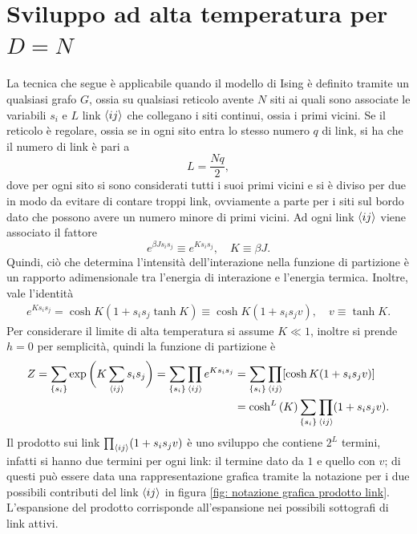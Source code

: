 \section{Sviluppo ad alta temperatura per \texorpdfstring{$D = N$}{D = N}}
La tecnica che segue è applicabile quando il modello di Ising è definito tramite un qualsiasi grafo $G$, ossia su qualsiasi reticolo avente $N$ siti ai quali sono associate le variabili $s_i$ e $L$ link $\langle ij \rangle$ che collegano i siti continui, ossia i primi vicini. Se il reticolo è regolare, ossia se in ogni sito entra lo stesso numero $q$ di link, si ha che il numero di link è pari a
\begin{equation}
    L = \frac{Nq}{2},
\end{equation}
dove per ogni sito si sono considerati tutti i suoi primi vicini e si è diviso per due in modo da evitare di contare troppi link, ovviamente a parte per i siti sul bordo dato che possono avere un numero minore di primi vicini. Ad ogni link $\langle ij \rangle$ viene associato il fattore
\begin{equation}
\label{eq: identità sviluppo alta T}
    e^{\beta Js_is_j} \equiv e^{Ks_is_j},\quad K \equiv \beta J.
\end{equation}
Quindi, ciò che determina l'intensità dell'interazione nella funzione di partizione è un rapporto adimensionale tra l'energia di interazione e l'energia termica. Inoltre, vale l'identità
\begin{equation}
\label{eq: relazione exp(Ksisj) e cosh(K)}
    \begin{split}
        e^{Ks_is_j} = \cosh{K}(1  + s_is_j\tanh{K}) \equiv \cosh{K}(1  + s_is_jv),\quad v \equiv \tanh{K}.
    \end{split}
\end{equation}
Per considerare il limite di alta temperatura si assume $K \ll 1$, inoltre si prende $h = 0$ per semplicità, quindi la funzione di partizione è
\begin{equation}
    \begin{split}
        Z = \sum_{\{s_i\}}\exp{\bigg(K\sum_{\langle ij \rangle}s_is_j\bigg)} = \sum_{\{s_i\}}\prod_{\langle ij \rangle}e^{Ks_is_j} &= \sum_{\{s_i\}}\prod_{\langle ij \rangle}[\cosh{K}(1  + s_is_jv)] \\
        &= \cosh^L{(K)}\sum_{\{s_i\}}\prod_{\langle ij \rangle}(1  + s_is_jv).
    \end{split}
\end{equation}
Il prodotto sui link $\prod_{\langle ij \rangle}(1  + s_is_jv)$ è uno sviluppo che contiene $2^L$ termini, infatti si hanno due termini per ogni link: il termine dato da $1$ e quello con $v$; di questi può essere data una rappresentazione grafica tramite la notazione per i due possibili contributi del link $\langle ij \rangle$ in figura \ref{fig: notazione grafica prodotto link}. L'espansione del prodotto corrisponde all'espansione nei possibili sottografi di link attivi. 
